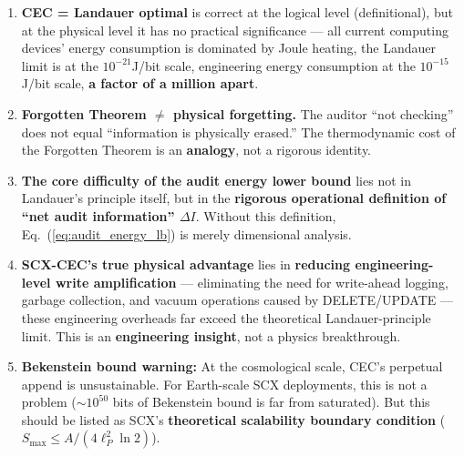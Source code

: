 \documentclass[12pt,a4paper]{article}
\theoremstyle{plain}
\theoremstyle{definition}
\begin{document}
\begin{honestbox}[title={Honest Critique Summary}]
\begin{enumerate}[leftmargin=*]
    \item \textbf{CEC = Landauer optimal} is correct at the logical level (definitional),
    but at the physical level it has no practical significance --- all current computing devices' energy consumption is dominated by Joule heating,
    the Landauer limit is at the $10^{-21}$J/bit scale, engineering energy consumption at the $10^{-15}$J/bit scale,
    \textbf{a factor of a million apart}.

    \item \textbf{Forgotten Theorem $\neq$ physical forgetting.}
    The auditor ``not checking'' does not equal ``information is physically erased.''
    The thermodynamic cost of the Forgotten Theorem is an \textbf{analogy}, not a rigorous identity.

    \item \textbf{The core difficulty of the audit energy lower bound} lies not in Landauer's principle itself,
    but in the \textbf{rigorous operational definition of ``net audit information'' $\Delta I$}.
    Without this definition, Eq.~(\ref{eq:audit_energy_lb}) is merely dimensional analysis.

    \item \textbf{SCX-CEC's true physical advantage} lies in \textbf{reducing engineering-level write amplification} ---
    eliminating the need for write-ahead logging, garbage collection, and vacuum operations caused by DELETE/UPDATE ---
    these engineering overheads far exceed the theoretical Landauer-principle limit.
    This is an \textbf{engineering insight}, not a physics breakthrough.

    \item \textbf{Bekenstein bound warning:} At the cosmological scale, CEC's perpetual append is unsustainable.
    For Earth-scale SCX deployments, this is not a problem ($\sim 10^{50}$ bits of Bekenstein bound is far from saturated).
    But this should be listed as SCX's \textbf{theoretical scalability boundary condition} ($S_{\max} \leq A/(4\ell_P^2 \ln 2)$).
\end{enumerate}
\end{honestbox}
\end{document}

